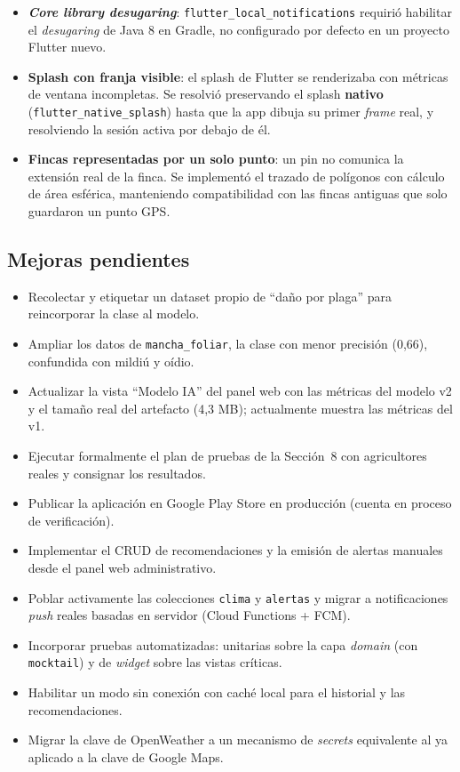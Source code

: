 \documentclass[12pt,a4paper]{article}
\begin{document}
\begin{itemize}
        que explica el uso antes de disparar el permiso del sistema y gestiona el
        caso de denegación permanente.
  \item \textbf{\textit{Core library desugaring}}:
        \texttt{flutter\_local\_notifications} requirió habilitar el
        \textit{desugaring} de Java 8 en Gradle, no configurado por defecto en un
        proyecto Flutter nuevo.
  \item \textbf{Splash con franja visible}: el splash de Flutter se renderizaba
        con métricas de ventana incompletas. Se resolvió preservando el splash
        \textbf{nativo} (\texttt{flutter\_native\_splash}) hasta que la app
        dibuja su primer \textit{frame} real, y resolviendo la sesión activa por
        debajo de él.
  \item \textbf{Fincas representadas por un solo punto}: un pin no comunica la
        extensión real de la finca. Se implementó el trazado de polígonos con
        cálculo de área esférica, manteniendo compatibilidad con las fincas
        antiguas que solo guardaron un punto GPS.
\end{itemize}

\subsection{Mejoras pendientes}

\begin{itemize}
  \item Recolectar y etiquetar un dataset propio de ``daño por plaga'' para
        reincorporar la clase al modelo.
  \item Ampliar los datos de \texttt{mancha\_foliar}, la clase con menor
        precisión (0{,}66), confundida con mildiú y oídio.
  \item Actualizar la vista ``Modelo IA'' del panel web con las métricas del
        modelo v2 y el tamaño real del artefacto (4{,}3 MB); actualmente muestra
        las métricas del v1.
  \item Ejecutar formalmente el plan de pruebas de la Sección~8 con agricultores
        reales y consignar los resultados.
  \item Publicar la aplicación en Google Play Store en producción (cuenta en
        proceso de verificación).
  \item Implementar el CRUD de recomendaciones y la emisión de alertas manuales
        desde el panel web administrativo.
  \item Poblar activamente las colecciones \texttt{clima} y \texttt{alertas} y
        migrar a notificaciones \textit{push} reales basadas en servidor (Cloud
        Functions + FCM).
  \item Incorporar pruebas automatizadas: unitarias sobre la capa \textit{domain}
        (con \texttt{mocktail}) y de \textit{widget} sobre las vistas críticas.
  \item Habilitar un modo sin conexión con caché local para el historial y las
        recomendaciones.
  \item Migrar la clave de OpenWeather a un mecanismo de \textit{secrets}
        equivalente al ya aplicado a la clave de Google Maps.
\end{itemize}
\end{document}

